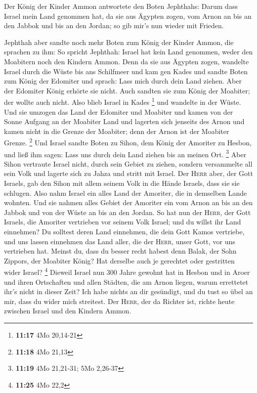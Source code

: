  Der König der Kinder Ammon antwortete den Boten
Jephthahs: Darum dass Israel mein Land genommen hat, da sie aus Ägypten
zogen, vom Arnon an bis an den Jabbok und bis an den Jordan; so gib
mir's nun wieder mit Frieden.

 Jephthah aber sandte noch mehr Boten zum König der
Kinder Ammon,  die sprachen zu ihm: So spricht Jephthah:
Israel hat kein Land genommen, weder den Moabitern noch den Kindern
Ammon.  Denn da sie aus Ägypten zogen, wandelte Israel
durch die Wüste bis ans Schilfmeer und kam gen Kades  und
sandte Boten zum König der Edomiter und sprach: Lass mich durch dein
Land ziehen. Aber der Edomiter König erhörte sie nicht. Auch sandten sie
zum König der Moabiter; der wollte auch nicht. Also blieb Israel in
Kades \footnote{\textbf{11:17} 4Mo 20,14-21}  und
wandelte in der Wüste. Und sie umzogen das Land der Edomiter und
Moabiter und kamen von der Sonne Aufgang an der Moabiter Land und
lagerten sich jenseits des Arnon und kamen nicht in die Grenze der
Moabiter; denn der Arnon ist der Moabiter Grenze. \footnote{\textbf{11:18}
  4Mo 21,13}  Und Israel sandte Boten zu Sihon, dem König
der Amoriter zu Hesbon, und ließ ihm sagen: Lass uns durch dein Land
ziehen bis an meinen Ort. \footnote{\textbf{11:19} 4Mo 21,21-31; 5Mo
  2,26-37}  Aber Sihon vertraute Israel nicht, durch sein
Gebiet zu ziehen, sondern versammelte all sein Volk und lagerte sich zu
Jahza und stritt mit Israel.  Der \textsc{Herr} aber, der
Gott Israels, gab den Sihon mit allem seinem Volk in die Hände Israels,
dass sie sie schlugen. Also nahm Israel ein alles Land der Amoriter, die
in demselben Lande wohnten.  Und sie nahmen alles Gebiet
der Amoriter ein vom Arnon an bis an den Jabbok und von der Wüste an bis
an den Jordan.  So hat nun der \textsc{Herr}, der Gott
Israels, die Amoriter vertrieben vor seinem Volk Israel; und du willst
ihr Land einnehmen?  Du solltest deren Land einnehmen,
die dein Gott Kamos vertriebe, und uns lassen einnehmen das Land aller,
die der \textsc{Herr}, unser Gott, vor uns vertrieben hat.
 Meinst du, dass du besser recht habest denn Balak, der
Sohn Zippors, der Moabiter König? Hat derselbe auch je gerechtet oder
gestritten wider Israel? \footnote{\textbf{11:25} 4Mo 22,2}
 Dieweil Israel nun 300 Jahre gewohnt hat in Hesbon und
in Aroer und ihren Ortschaften und allen Städten, die am Arnon liegen,
warum errettetet ihr's nicht in dieser Zeit?  Ich habe
nichts an dir gesündigt, und du tust so übel an mir, dass du wider mich
streitest. Der \textsc{Herr}, der da Richter ist, richte heute zwischen
Israel und den Kindern Ammon.

